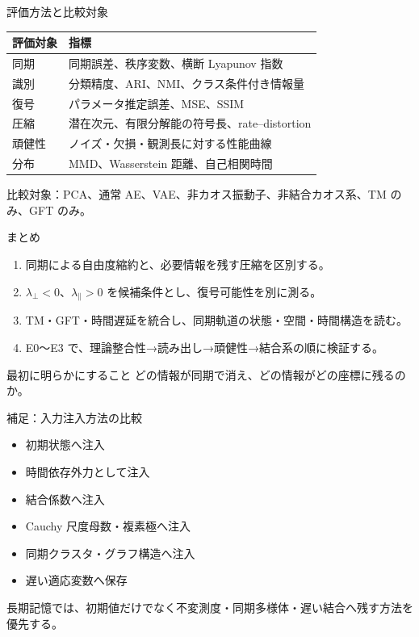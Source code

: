 \documentclass[aspectratio=169,11pt]{beamer}
\newcommand{\lperp}{\lambda_{\perp}}
\newcommand{\lpara}{\lambda_{\parallel}}
\begin{document}
\begin{frame}{評価方法と比較対象}
  \small
  \begin{tabular}{p{}p{}}
    \toprule
    評価対象 & 指標 \\
    \midrule
    同期 & 同期誤差、秩序変数、横断 Lyapunov 指数 \\
    識別 & 分類精度、ARI、NMI、クラス条件付き情報量 \\
    復号 & パラメータ推定誤差、MSE、SSIM \\
    圧縮 & 潜在次元、有限分解能の符号長、rate--distortion \\
    頑健性 & ノイズ・欠損・観測長に対する性能曲線 \\
    分布 & MMD、Wasserstein 距離、自己相関時間 \\
    \bottomrule
  \end{tabular}
  \vfill
  比較対象：PCA、通常 AE、VAE、非カオス振動子、非結合カオス系、TM のみ、GFT のみ。
\end{frame}

\begin{frame}{まとめ}
  \begin{enumerate}
    \item 同期による自由度縮約と、必要情報を残す圧縮を区別する。
    \item \(\lperp<0\)、\(\lpara>0\) を候補条件とし、復号可能性を別に測る。
    \item TM・GFT・時間遅延を統合し、同期軌道の状態・空間・時間構造を読む。
    \item E0〜E3 で、理論整合性→読み出し→頑健性→結合系の順に検証する。
  \end{enumerate}
  \vfill
  \begin{alertblock}{最初に明らかにすること}
    どの情報が同期で消え、どの情報がどの座標に残るのか。
  \end{alertblock}
\end{frame}

\appendix
\begin{frame}{補足：入力注入方法の比較}
  \begin{itemize}
    \item 初期状態へ注入
    \item 時間依存外力として注入
    \item 結合係数へ注入
    \item Cauchy 尺度母数・複素極へ注入
    \item 同期クラスタ・グラフ構造へ注入
    \item 遅い適応変数へ保存
  \end{itemize}
  長期記憶では、初期値だけでなく不変測度・同期多様体・遅い結合へ残す方法を優先する。
\end{frame}
\end{document}
